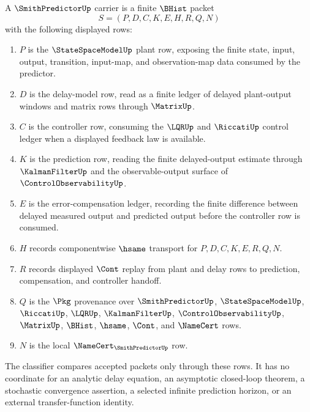 \begin{definition}
\label{def:smith-predictor-carrier}
A $\SmithPredictorUp$ carrier is a finite $\BHist$ packet
$$
S=(P,D,C,K,E,H,R,Q,N)
$$
with the following displayed rows:
\begin{enumerate}
\item $P$ is the $\StateSpaceModelUp$ plant row, exposing the finite state, input, output, transition, input-map, and observation-map data consumed by the predictor.
\item $D$ is the delay-model row, read as a finite ledger of delayed plant-output windows and matrix rows through $\MatrixUp$.
\item $C$ is the controller row, consuming the $\LQRUp$ and $\RiccatiUp$ control ledger when a displayed feedback law is available.
\item $K$ is the prediction row, reading the finite delayed-output estimate through $\KalmanFilterUp$ and the observable-output surface of $\ControlObservabilityUp$.
\item $E$ is the error-compensation ledger, recording the finite difference between delayed measured output and predicted output before the controller row is consumed.
\item $H$ records componentwise $\hsame$ transport for $P,D,C,K,E,R,Q,N$.
\item $R$ records displayed $\Cont$ replay from plant and delay rows to prediction, compensation, and controller handoff.
\item $Q$ is the $\Pkg$ provenance over $\SmithPredictorUp$, $\StateSpaceModelUp$, $\RiccatiUp$, $\LQRUp$, $\KalmanFilterUp$, $\ControlObservabilityUp$, $\MatrixUp$, $\BHist$, $\hsame$, $\Cont$, and $\NameCert$ rows.
\item $N$ is the local $\NameCert_{\SmithPredictorUp}$ row.
\end{enumerate}
The classifier compares accepted packets only through these rows. It has no coordinate for an analytic delay equation, an asymptotic closed-loop theorem, a stochastic convergence assertion, a selected infinite prediction horizon, or an external transfer-function identity.
\end{definition}

